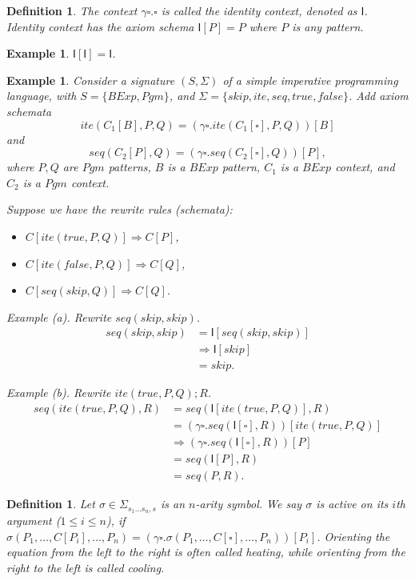 \documentclass{article}
\theoremstyle{plain}
\newtheorem{defn}[thm]{Definition}
\newtheorem{eg}[thm]{Example}
\def\I{\textsf{I}}
\begin{document}
\begin{defn}
	The context $\gamma \square . \square$ is called the identity context, denoted as $\I$. Identity context has the axiom schema $\I[P]=P$ where $P$ is any pattern.
\end{defn}

\begin{eg}
	$\I[\I] = \I$.
\end{eg}

\begin{eg}
	Consider a signature $(S,\Sigma)$ of a simple imperative programming language, with $S = \{{BExp},{Pgm}\}$, and $\Sigma = \{skip, {ite}, {seq}, true, false\}$. Add axiom schemata $${ite}(C_1[B], P, Q) = (\gamma \square . {ite}(C_1[\square], P, Q))[B]$$ and $${seq}(C_2[P],Q) = (\gamma \square . {seq}(C_2[\square], Q))[P],$$ where $P, Q$ are ${Pgm}$ patterns, $B$ is a ${BExp}$ pattern, $C_1$ is a ${BExp}$ context, and $C_2$ is a ${Pgm}$ context.
	
	Suppose we have the rewrite rules (schemata):
	\begin{itemize}
		\item $C[{ite}({true}, P, Q)] \Rightarrow C[P]$,
		\item $C[{ite}({false}, P, Q)] \Rightarrow C[Q]$,
		\item $C[{seq}({skip},Q)] \Rightarrow C[Q]$.
	\end{itemize}
	
	Example (a). Rewrite $seq(skip,skip)$.
	\begin{align*}
	seq(skip,skip)
	&= \mathsf{I}[seq(skip,skip)] \\
	&\Rightarrow \mathsf{I}[skip] \\
	&= skip.
	\end{align*}
	
	Example (b). Rewrite $ite(true, P, Q); R$.
	\begin{align*}
	seq(ite(true, P, Q), R) 
	&= seq(\I[ite(true, P, Q)], R) \\
	&= (\gamma \square . seq(\I[\square], R))[ite(true, P, Q)] \\
	&\Rightarrow (\gamma \square . seq(\I[\square], R))[P] \\
	&= seq(\I[P], R) \\
	&= seq(P, R).
	\end{align*}
\end{eg}

\begin{defn}
	Let $\sigma \in \Sigma_{s_1\dots s_n, s}$ is an $n$-arity symbol. We say $\sigma$ is \emph{active} on its $i$th argument ($1 \le i \le n$), if
	$\sigma(P_1,\dots, C[P_i], \dots, P_n)
	= (\gamma \square . \sigma(P_1,\dots,C[\square], \dots, P_n))[P_i]$. Orienting the equation from the left to the right is often called \emph{heating}, while orienting from the right to the left is called \emph{cooling}.
\end{defn}
\end{document}
